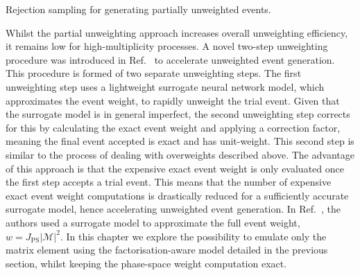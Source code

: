 \documentclass[main.tex]{subfiles}
\begin{document}
\begin{algorithm}
    \caption{Rejection sampling for generating partially unweighted events.}
    \label{alg:partial_unweighting}
\end{algorithm}

Whilst the partial unweighting approach increases overall unweighting efficiency,
it remains low for high-multiplicity processes.
A novel two-step unweighting procedure was introduced in Ref.~\cite{Danziger:2021eeg}
to accelerate unweighted event generation. This procedure is formed of two separate
unweighting steps. The first unweighting step uses
a lightweight surrogate neural network model, which approximates the event weight,
to rapidly unweight the trial event. Given that the surrogate model is in general imperfect, the
second unweighting step corrects for this by calculating the exact event weight
and applying a correction factor, meaning the final event accepted is exact and has
unit-weight. This second step is similar to the process of dealing with overweights described
above.
The advantage of this approach is that the expensive exact event weight is only
evaluated once the first step accepts a trial event. This means that the number of 
expensive exact event weight computations is drastically reduced for a sufficiently accurate
surrogate model, hence accelerating unweighted event generation. In Ref.~\cite{Danziger:2021eeg},
the authors used a surrogate model to approximate the full event weight, 
$w = J_{\mathrm{PS}} |\mathcal{M}|^{2}$. In this chapter we explore the possibility
to emulate only the matrix element using the factorisation-aware model detailed in the
previous section, whilst keeping the phase-space weight computation exact.
\end{document}
